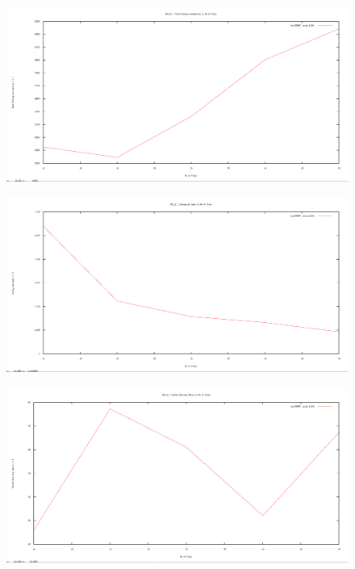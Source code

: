 \documentclass[12pt]{article}
\begin{document}
\begin{figure}[H]
	\centering
	\includegraphics[scale=	0.26]{image/802.11/Energyconsumption_vs_flows.png}
\end{figure}

\begin{figure}[H]
	\centering
	\includegraphics[scale=	0.26]{image/802.11/Energyperbytes_vs_flows.png}
\end{figure}

\begin{figure}[H]
	\centering
	\includegraphics[scale=	0.26]{image/802.11/Packetdeliveryratio_vs_flows.png}
\end{figure}
\end{document}
